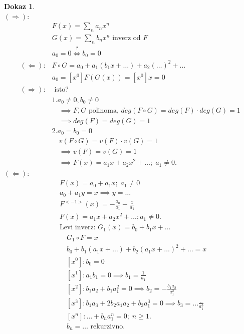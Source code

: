 \documentclass[a4paper, 12pt]{book}
\theoremstyle{definition}
\newtheorem{pro}[counter]{Dokaz}
\theoremstyle{remark}
\begin{document}
\begin{pro} \text{} \\
  $(\Longrightarrow)$:
  \begin{align*}
    &F(x) = \sum_n a_n x^n \\
    &G(x) = \sum_n b_n x^n \text{ inverz od }F \\
    &a_0 = 0 \stackrel{?}{\iff} b_0 = 0 \\
    (\Longleftarrow): &F \circ G = a_0 + a_1(b_1 x + \dots) + a_2(\dots)^2 + \dots \\
    &a_0 = [x^0] F(G(x)) = [x^0] x = 0 \\
    (\Longrightarrow): &\text{ isto?} \\
    &1. a_0 \neq 0, b_0 \neq 0 \\
    &\quad \implies F,G \text{ polinoma, } deg(F \circ G) = deg(F) \cdot deg(G) = 1 \\
    &\quad \implies deg(F) = deg(G) = 1 \\
    &2. a_0 = b_0 = 0 \\
    &\quad v(F \circ G) = v(F) \cdot v(G) = 1 \\
    &\quad \implies v(F) = v(G) = 1 \\
    &\quad \implies F(x) = a_1 x + a_2 x^2 + \dots; \; a_1 \neq 0.
  \end{align*}
  $(\Longleftarrow)$:
  \begin{align*}
    &F(x) = a_0 + a_1 x; \; a_1 \neq 0 \\
    &a_0 + a_1 y = x \implies y = \dots \\
    &F^{<-1>}(x) = -\frac{a_0}{a_1} + \frac{x}{a_1} \\
    &F(x) = a_1 x + a_2 x^2 + \dots; a_1 \neq 0. \\
    &\text{Levi inverz: } G_1(x) = b_0 + b_1 x + \dots \\
    &\quad G_1 \circ F = x \\
    &\quad b_0 + b_1 (a_1 x + \dots) + b_2 (a_1 x + \dots)^2 + \dots = x \\
    &\quad [x^0]: b_0 = 0 \\
    &\quad [x^1]: a_1 b_1 = 0 \implies b_1 = \frac{1}{a_1} \\
    &\quad [x^2]: b_1 a_2 + b_1 a_1^2 = 0 \implies b_2 = -\frac{b_1 a_2}{a_1^2} \\
    &\quad [x^3]: b_1 a_3 + 2 b_2 a_1 a_2 + b_3 a_1^3 = 0 \implies b_3 = \dots \frac{..}{a_1^3} \\
    &\quad [x^n]: \dots + b_n a_1^n = 0; \; n \geq 1. \\
    &\quad b_n = \dots \text{ rekurzivno.} \\

\end{align*}
\end{pro}
\end{document}
